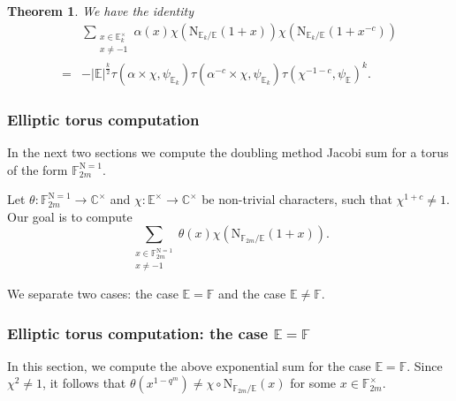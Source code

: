\documentclass[12pt, reqno]{amsart}
\newtheorem{theorem}{Theorem}[section]
\theoremstyle{definition}
\theoremstyle{definition}
\theoremstyle{definition}
\newcommand{\cComplex}{\mathbb{C}}
\newcommand{\multiplicativegroup}[1]{#1^{\times}}
\newcommand{\sizeof}[1]{\left|#1\right|}
\newcommand{\fieldCharacter}{\psi}
\newcommand{\minusInvolution}[1]{#1^{-c}}
\newcommand{\involutionPlusOne}[1]{#1^{1+c}}
\newcommand{\minusInvolutionMinusOne}[1]{#1^{-1-c}}
\newcommand{\aFieldNorm}{\mathrm{N}}
\newcommand{\finiteField}{\mathbb{F}}
\newcommand{\quadraticExtension}{\mathbb{E}}
\newcommand{\finiteFieldExtension}[1]{\finiteField_{#1}}
\newcommand{\quadraticFieldExtension}[1]{\quadraticExtension_{#1}}
\newcommand{\NormOneGroup}[1]{\finiteFieldExtension{#1}^{\aFieldNorm = 1}}
\newcommand{\GaussSumSingleCharacter}[2]{\tau\left(#1, #2\right)}
\newcommand{\GaussSumCharacter}[3]{\tau\left(#1 \times #2, #3\right)}
\begin{document}
\begin{theorem}We have the identity
\begin{align*}
	& \sum_{\substack{x \in \multiplicativegroup{\quadraticFieldExtension{k}}\\
			x \ne -1}} \alpha \left(x\right) \chi\left(\aFieldNorm_{\quadraticFieldExtension{k} \slash \quadraticExtension}\left(1 + x\right)\right) \chi\left(\aFieldNorm_{\quadraticFieldExtension{k} \slash \quadraticExtension}\left(1 + \minusInvolution{x}\right)\right) \\
	=& -\sizeof{\quadraticExtension}^{\frac{k}{2}} \GaussSumCharacter{\alpha}{\chi}{\fieldCharacter_{\quadraticFieldExtension{k}}} \GaussSumCharacter{\minusInvolution{\alpha}}{\chi}{\fieldCharacter_{\quadraticFieldExtension{k}}} \GaussSumSingleCharacter{\minusInvolutionMinusOne{\chi}}{\fieldCharacter_{\quadraticExtension}}^k.
\end{align*}
\end{theorem}

\subsubsection{Elliptic torus computation}
In the next two sections we compute the doubling method Jacobi sum for a torus of the form $\NormOneGroup{2m}$.

Let $\theta \colon \NormOneGroup{2m} \to \multiplicativegroup{\cComplex}$ and $\chi \colon \multiplicativegroup{\quadraticExtension} \to \multiplicativegroup{\cComplex}$ be non-trivial characters, such that $\involutionPlusOne{\chi} \ne 1$. Our goal is to compute $$\sum_{\substack{x \in \NormOneGroup{2m}\\
		x \ne -1}} \theta \left(x\right) \chi\left(\aFieldNorm_{\finiteFieldExtension{2m} \slash \quadraticExtension}\left(1 + x\right)\right).$$

We separate two cases: the case $\quadraticExtension = \finiteField$ and the case $\quadraticExtension \ne \finiteField$.

\subsubsection{Elliptic torus computation: the case $\quadraticExtension = \finiteField$}
In this section, we compute the above exponential sum for the case $\quadraticExtension = \finiteField$. Since $\chi^2 \ne 1$, it follows that $\theta\left(x^{1-q^m}\right) \ne \chi \circ \aFieldNorm_{\finiteFieldExtension{2m} \slash \quadraticExtension}\left(x\right)$ for some $x \in \multiplicativegroup{\finiteFieldExtension{2m}}$.
\end{document}
